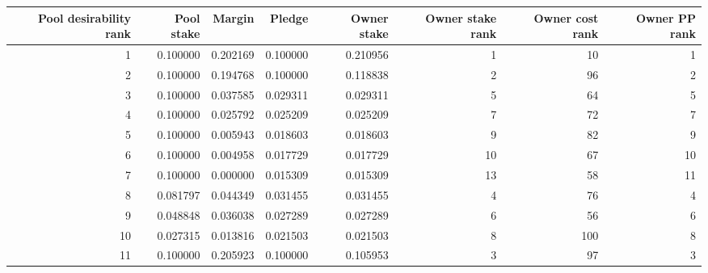 \begin{tabular}{rrrrrrrr}
\toprule
 Pool desirability rank &  Pool stake &   Margin &   Pledge &  Owner stake &  Owner stake rank &  Owner cost rank &  Owner PP rank \\
\midrule
                      1 &    0.100000 & 0.202169 & 0.100000 &     0.210956 &                 1 &               10 &              1 \\
                      2 &    0.100000 & 0.194768 & 0.100000 &     0.118838 &                 2 &               96 &              2 \\
                      3 &    0.100000 & 0.037585 & 0.029311 &     0.029311 &                 5 &               64 &              5 \\
                      4 &    0.100000 & 0.025792 & 0.025209 &     0.025209 &                 7 &               72 &              7 \\
                      5 &    0.100000 & 0.005943 & 0.018603 &     0.018603 &                 9 &               82 &              9 \\
                      6 &    0.100000 & 0.004958 & 0.017729 &     0.017729 &                10 &               67 &             10 \\
                      7 &    0.100000 & 0.000000 & 0.015309 &     0.015309 &                13 &               58 &             11 \\
                      8 &    0.081797 & 0.044349 & 0.031455 &     0.031455 &                 4 &               76 &              4 \\
                      9 &    0.048848 & 0.036038 & 0.027289 &     0.027289 &                 6 &               56 &              6 \\
                     10 &    0.027315 & 0.013816 & 0.021503 &     0.021503 &                 8 &              100 &              8 \\
                     11 &    0.100000 & 0.205923 & 0.100000 &     0.105953 &                 3 &               97 &              3 \\
\bottomrule
\end{tabular}
